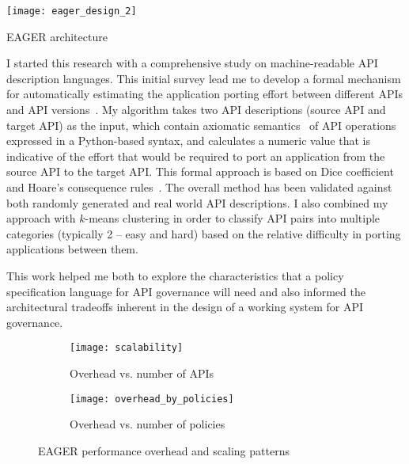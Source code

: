 \begin{floatingfigure}[rb]{2.8in}
\vspace{-0.1in}
\texttt{[image: eager\_design\_2]}
\vspace{-0.08in}
\caption{EAGER architecture\label{fig:eager}}
\end{floatingfigure}

I started this research with a comprehensive study on machine-readable 
API description languages. This initial survey lead me to develop a formal 
mechanism for automatically estimating the application porting effort between 
different APIs and API versions~\cite{6930607}. My algorithm takes two API descriptions 
(source API and target API) as the input, which contain axiomatic semantics~\cite{Hoare:1969:ABC:363235.363259} of 
API operations expressed in a Python-based syntax, and calculates a numeric 
value that is indicative of the effort that would be required to port an application 
from the source API to the target API. This formal approach is based on Dice 
coefficient~\cite{dice1945,738528} 
and Hoare's consequence rules~\cite{Hoare:1969:ABC:363235.363259}. The overall method has been 
validated against both randomly generated and real world API descriptions. 
I also combined my approach with $k$-means clustering in order to classify API pairs into 
multiple categories (typically 2 -- easy and hard) based on the relative difficulty in 
porting applications between them. %

This work helped me both to explore the characteristics that a policy
specification language for API governance will need and also informed the
architectural tradeoffs inherent in the design of a working system for API
governance.


\begin{figure}
\centering
\begin{subfigure}{.5\textwidth}
  \centering
  \texttt{[image: scalability]}
  \caption{Overhead vs. number of APIs}
  \label{fig:sub1}
\end{subfigure}%
\begin{subfigure}{.5\textwidth}
  \centering
  \texttt{[image: overhead\_by\_policies]}
  \caption{Overhead vs. number of policies}
  \label{fig:sub2}
\end{subfigure}
\caption{EAGER performance overhead and scaling patterns}
\label{fig:eager_perf}
\end{figure}

